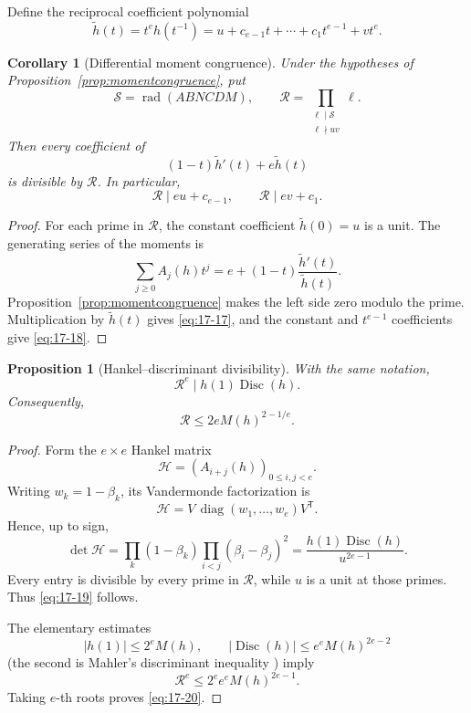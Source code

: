 \documentclass[11pt]{article}
\numberwithin{equation}{section}
\newtheorem{proposition}[theorem]{Proposition}
\newtheorem{corollary}[theorem]{Corollary}
\theoremstyle{definition}
\newcommand{\Disc}{\operatorname{Disc}}
\begin{document}
Define the reciprocal coefficient polynomial
\[
 \widetilde h(t)=t^eh(t^{-1})
 =u+c_{e-1}t+\cdots+c_1t^{e-1}+vt^e.
\]

\begin{corollary}[Differential moment congruence]
\label{cor:momentdifferential}
Under the hypotheses of Proposition~\ref{prop:momentcongruence}, put
\[
 \mathcal S=\operatorname{rad}(ABNCDM),
 \qquad
 \mathcal R=\prod_{\substack{\ell\mid\mathcal S\\ \ell\nmid uv}}\ell.
\]
Then every coefficient of
\begin{equation}
 (1-t)\widetilde h'(t)+e\widetilde h(t)
 \label{eq:17-17}
\end{equation}
is divisible by \(\mathcal R\).  In particular,
\begin{equation}
 \mathcal R\mid eu+c_{e-1},
 \qquad
 \mathcal R\mid ev+c_1.
 \label{eq:17-18}
\end{equation}
\end{corollary}

\begin{proof}
For each prime in \(\mathcal R\), the constant coefficient
\(\widetilde h(0)=u\) is a unit.  The generating series of the moments is
\[
 \sum_{j\geq0}A_j(h)t^j
 =e+(1-t)\frac{\widetilde h'(t)}{\widetilde h(t)}.
\]
Proposition~\ref{prop:momentcongruence} makes the left side zero modulo the
prime.  Multiplication by \(\widetilde h(t)\) gives \eqref{eq:17-17}, and the
constant and \(t^{e-1}\) coefficients give \eqref{eq:17-18}.
\end{proof}

\begin{proposition}[Hankel--discriminant divisibility]
\label{prop:hankeldisc}
With the same notation,
\begin{equation}
 \boxed{\mathcal R^e\mid h(1)\Disc(h).}
 \label{eq:17-19}
\end{equation}
Consequently,
\begin{equation}
 \mathcal R\leq2eM(h)^{2-1/e}.
 \label{eq:17-20}
\end{equation}
\end{proposition}

\begin{proof}
Form the \(e\times e\) Hankel matrix
\[
 \mathcal H=(A_{i+j}(h))_{0\leq i,j<e}.
\]
Writing \(w_k=1-\beta_k\), its Vandermonde factorization is
\[
 \mathcal H=V\,\operatorname{diag}(w_1,\ldots,w_e)V^{\mathsf T}.
\]
Hence, up to sign,
\begin{equation}
 \det\mathcal H
 =\prod_k(1-\beta_k)
  \prod_{i<j}(\beta_i-\beta_j)^2
 =\frac{h(1)\Disc(h)}{u^{2e-1}}.
 \label{eq:17-21}
\end{equation}
Every entry is divisible by every prime in \(\mathcal R\), while \(u\) is a
unit at those primes.  Thus \eqref{eq:17-19} follows.

The elementary estimates
\[
 |h(1)|\leq2^eM(h),
 \qquad
 |\Disc(h)|\leq e^eM(h)^{2e-2}
\]
(the second is Mahler's discriminant inequality \cite{Mahler1964}) imply
\[
 \mathcal R^e
 \leq2^ee^eM(h)^{2e-1}.
\]
Taking \(e\)-th roots proves \eqref{eq:17-20}.
\end{proof}
\end{document}
